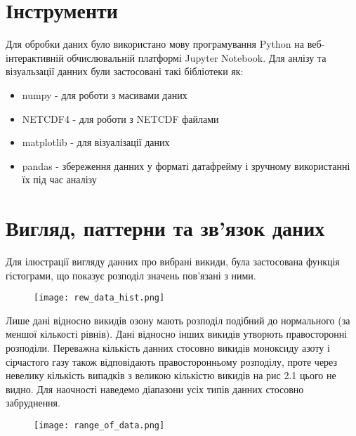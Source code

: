 \section{Інструменти}

Для обробки даних було використано мову програмування Python на веб-інтерактивній обчислювальній платформі Jupyter Notebook. 
Для анлізу та візуальзації данних були застосовані такі бібліотеки як: 

\begin{itemize}
    \item numpy - для роботи з масивами даних
    \item NETCDF4 - для роботи з NETCDF файлами
    \item matplotlib - для візуалізації даних
    \item pandas - збереження данних у форматі датафрейму і зручному використанні їх під час аналізу
\end{itemize}

\section{Вигляд, паттерни та зв'язок даних}


Для ілюстрації вигляду данних про вибрані викиди, була застосована функція гістограми, що показує розподіл значень пов'язані з ними. 

\begin{center}
    \begin{figure}[h]
        \texttt{[image: rew\_data\_hist.png]}
    \end{figure}
\end{center}

Лише дані відносно викидів озону мають розподіл подібний до нормального (за меншої кількості рівнів).
Дані відносно інших викидів утворють правосторонні розподіли.
Переважна кількість данних стосовно викидів моноксиду азоту і сірчастого газу також відповідають правосторонньому розподілу, проте через невелику кількість випадків з великою кількістю викидів на рис 2.1 цього не видно.
Для наочності наведемо діапазони усіх типів данних стосовно забруднення. 


\begin{center}
    \begin{figure}[h]
        \texttt{[image: range\_of\_data.png]}
    \end{figure}
\end{center}

